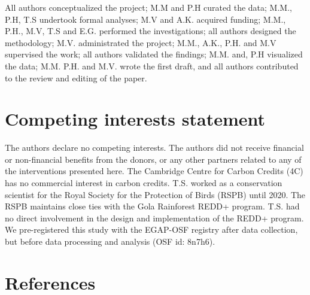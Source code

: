 \documentclass[
]{article}
\begin{document}
All authors conceptualized the project; M.M and P.H curated the data;
M.M., P.H, T.S undertook formal analyses; M.V and A.K. acquired funding;
M.M., P.H., M.V, T.S and E.G. performed the investigations; all authors
designed the methodology; M.V. administrated the project; M.M., A.K.,
P.H. and M.V supervised the work; all authors validated the findings;
M.M. and, P.H visualized the data; M.M. P.H. and M.V. wrote the first
draft, and all authors contributed to the review and editing of the
paper.

\hypertarget{competing-interests-statement}{%
\section{Competing interests
statement}\label{competing-interests-statement}}

The authors declare no competing interests. The authors did not receive
financial or non-financial benefits from the donors, or any other
partners related to any of the interventions presented here. The
Cambridge Centre for Carbon Credits (4C) has no commercial interest in
carbon credits. T.S. worked as a conservation scientist for the Royal
Society for the Protection of Birds (RSPB) until 2020. The RSPB
maintains close ties with the Gola Rainforest REDD+ program. T.S. had no
direct involvement in the design and implementation of the REDD+
program. We pre-registered this study with the EGAP-OSF registry after
data collection, but before data processing and analysis (OSF id:
8n7h6).

\hypertarget{references}{%
\section*{References}\label{references}}
\end{document}
